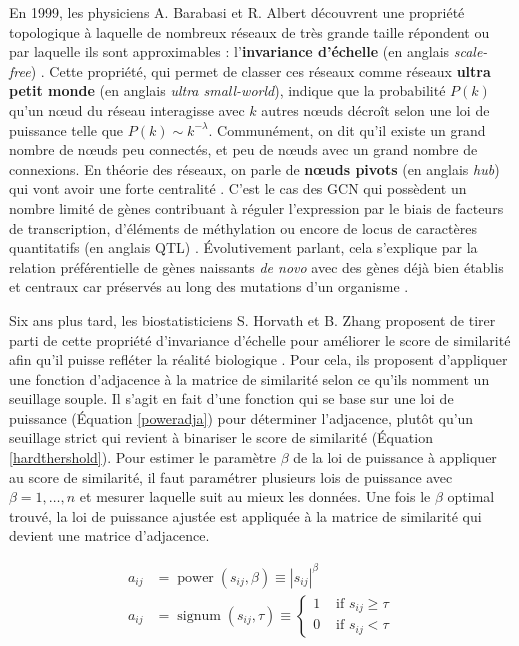 En 1999, les physiciens A. Barabasi et R. Albert découvrent une propriété topologique à laquelle de nombreux réseaux de très grande taille répondent ou par laquelle ils sont approximables \cite{Broido2019Mar} : l'\textbf{invariance d'échelle} (en anglais \textit{scale-free}) \cite{Barabasi1999Oct}. Cette propriété, qui permet de classer ces réseaux comme réseaux \textbf{ultra petit monde} \cite{Cohen2003Feb} (en anglais \textit{ultra small-world}), indique que la probabilité $P(k)$ qu'un nœud du réseau interagisse avec $k$ autres nœuds décroît selon une loi de puissance telle que $P(k) \sim k^{-\lambda}$. Communément, on dit qu'il existe un grand nombre de nœuds peu connectés, et peu de nœuds avec un grand nombre de connexions. En théorie des réseaux, on parle de \textbf{nœuds pivots} (en anglais \textit{hub}) qui vont avoir une forte centralité \cite{VanDam2018}. C'est le cas des \acrshort{GCN} qui possèdent un nombre limité de gènes contribuant à réguler l'expression par le biais de facteurs de transcription, d'éléments de méthylation ou encore de locus de caractères quantitatifs (en anglais \acrfull{QTL}) \cite{Serin2016}. Évolutivement parlant, cela s'explique par la relation préférentielle de gènes naissants \textit{de novo} avec des gènes déjà bien établis et centraux car préservés au long des mutations d'un organisme \cite{Barabasi2004}.


Six ans plus tard, les biostatisticiens S. Horvath et B. Zhang proposent de tirer parti de cette propriété d'invariance d'échelle pour améliorer le score de similarité afin qu'il puisse refléter la réalité biologique \cite{Zhang2005a}. Pour cela, ils proposent d'appliquer une fonction d'adjacence à la matrice de similarité selon ce qu'ils nomment un seuillage souple. Il s'agit en fait d'une fonction qui se base sur une loi de puissance (Équation \ref{poweradja}) pour déterminer l'adjacence, plutôt qu'un seuillage strict qui revient à binariser le score de similarité (Équation \ref{hardthershold}). Pour estimer le paramètre $\beta$ de la loi de puissance à appliquer au score de similarité, il faut paramétrer plusieurs lois de puissance avec $\beta = 1, \dots, n$ et mesurer laquelle suit au mieux les données. Une fois le $\beta$ optimal trouvé, la loi de puissance ajustée est appliquée à la matrice de similarité qui devient une matrice d'adjacence. 

\begin{align} 
    a_{i j} &= \operatorname{power}\left(s_{i j}, \beta\right) \equiv\left|s_{i j}\right|^{\beta} \label{poweradja} \\
    a_{i j} &= \operatorname{signum}\left(s_{i j}, \tau\right) \equiv \begin{cases}1 & \text { if } s_{i j} \geq \tau \\ 0 & \text { if } s_{i j}<\tau\end{cases} \label{hardthershold}
\end{align}

